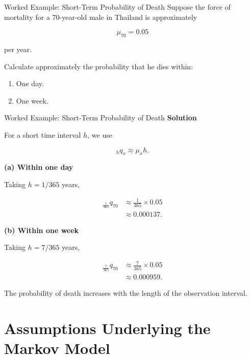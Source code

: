 \documentclass[
  ignorenonframetext,
  aspectratio=169,
]{beamer}
\providecommand{\tightlist}{%
  \setlength{\itemsep}{0pt}\setlength{\parskip}{0pt}}
\begin{document}
\begin{frame}{Worked Example: Short-Term Probability of Death}
\protect{}\label{worked-example-short-term-probability-of-death}
Suppose the force of mortality for a 70-year-old male in Thailand is
approximately

\[
\mu_{70}=0.05
\]

per year.

Calculate approximately the probability that he dies within:

\begin{enumerate}
\tightlist
\item
  One day.
\item
  One week.
\end{enumerate}
\end{frame}

\begin{frame}{Worked Example: Short-Term Probability of Death}
\protect{}\label{worked-example-short-term-probability-of-death-1}
\textbf{Solution}

For a short time interval \(h\), we use

\[
{}_hq_x\approx \mu_xh.
\]

\textbf{(a) Within one day}

Taking \(h=1/365\) years,

\[
\begin{aligned}
{}_{\frac{1}{365}}q_{70}
&\approx \frac{1}{365}\times 0.05\\
&\approx 0.000137.
\end{aligned}
\]

\textbf{(b) Within one week}

Taking \(h=7/365\) years,

\[
\begin{aligned}
{}_{\frac{7}{365}}q_{70}
&\approx \frac{7}{365}\times 0.05\\
&\approx 0.000959.
\end{aligned}
\]

The probability of death increases with the length of the observation
interval.
\end{frame}

\section{Assumptions Underlying the Markov
Model}\label{assumptions-underlying-the-markov-model}
\end{document}
